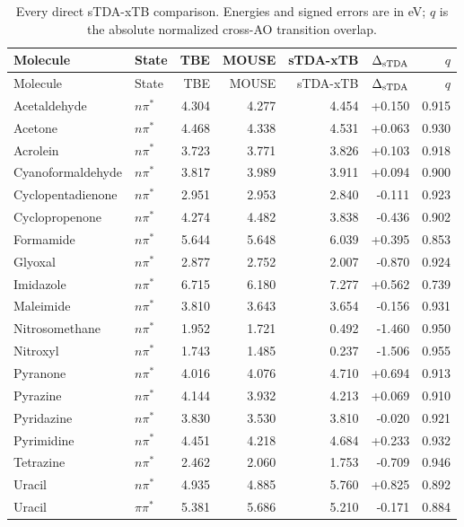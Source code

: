 \begin{longtable}{llrrrrr}
\caption{Every direct sTDA-xTB comparison. Energies and signed errors are in eV; $q$ is the absolute normalized cross-AO transition overlap.}\label{tab:allstda}\\
\toprule Molecule & State & TBE & MOUSE & sTDA-xTB & $\Delta_{\rm sTDA}$ & $q$\\\midrule\endfirsthead
\toprule Molecule & State & TBE & MOUSE & sTDA-xTB & $\Delta_{\rm sTDA}$ & $q$\\\midrule\endhead
Acetaldehyde & $n\pi^*$ & 4.304 & 4.277 & 4.454 & +0.150 & 0.915 \\
Acetone & $n\pi^*$ & 4.468 & 4.338 & 4.531 & +0.063 & 0.930 \\
Acrolein & $n\pi^*$ & 3.723 & 3.771 & 3.826 & +0.103 & 0.918 \\
Cyanoformaldehyde & $n\pi^*$ & 3.817 & 3.989 & 3.911 & +0.094 & 0.900 \\
Cyclopentadienone & $n\pi^*$ & 2.951 & 2.953 & 2.840 & -0.111 & 0.923 \\
Cyclopropenone & $n\pi^*$ & 4.274 & 4.482 & 3.838 & -0.436 & 0.902 \\
Formamide & $n\pi^*$ & 5.644 & 5.648 & 6.039 & +0.395 & 0.853 \\
Glyoxal & $n\pi^*$ & 2.877 & 2.752 & 2.007 & -0.870 & 0.924 \\
Imidazole & $n\pi^*$ & 6.715 & 6.180 & 7.277 & +0.562 & 0.739 \\
Maleimide & $n\pi^*$ & 3.810 & 3.643 & 3.654 & -0.156 & 0.931 \\
Nitrosomethane & $n\pi^*$ & 1.952 & 1.721 & 0.492 & -1.460 & 0.950 \\
Nitroxyl & $n\pi^*$ & 1.743 & 1.485 & 0.237 & -1.506 & 0.955 \\
Pyranone & $n\pi^*$ & 4.016 & 4.076 & 4.710 & +0.694 & 0.913 \\
Pyrazine & $n\pi^*$ & 4.144 & 3.932 & 4.213 & +0.069 & 0.910 \\
Pyridazine & $n\pi^*$ & 3.830 & 3.530 & 3.810 & -0.020 & 0.921 \\
Pyrimidine & $n\pi^*$ & 4.451 & 4.218 & 4.684 & +0.233 & 0.932 \\
Tetrazine & $n\pi^*$ & 2.462 & 2.060 & 1.753 & -0.709 & 0.946 \\
Uracil & $n\pi^*$ & 4.935 & 4.885 & 5.760 & +0.825 & 0.892 \\
Uracil & $\pi\pi^*$ & 5.381 & 5.686 & 5.210 & -0.171 & 0.884 \\
\bottomrule\end{longtable}
